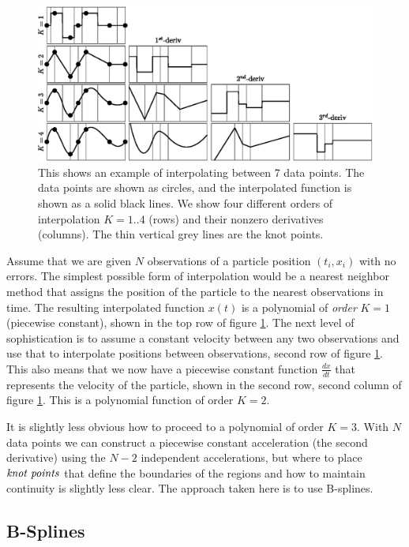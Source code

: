 \documentclass[10pt,journal]{IEEEtran}
\begin{document}
\begin{figure}[t]
  \centerline{\includegraphics[width=39pc,angle=0]{figures/interpolation}}
  
  \caption{This shows an example of interpolating between 7 data points. The data points are shown as circles, and the interpolated function is shown as a solid black lines. We show four different orders of interpolation $K=1..4$ (rows) and their nonzero derivatives (columns). The thin vertical grey lines are the knot points.}
  \label{interpolation}
\end{figure}

Assume that we are given $N$ observations of a particle position $(t_i,x_i)$ with no errors. The simplest possible form of interpolation would be a nearest neighbor method that assigns the position of the particle to the nearest observations in time. The resulting interpolated function $x(t)$ is a polynomial of \emph{order} $K=1$ (piecewise constant), shown in the top row of figure \ref{interpolation}. The next level of sophistication is to assume a constant velocity between any two observations and use that to interpolate positions between observations, second row of figure \ref{interpolation}. This also means that we now have a piecewise constant function $\frac{dx}{dt}$ that represents the velocity of the particle, shown in the second row, second column of figure  \ref{interpolation}. This is a polynomial function of order $K=2$.

It is slightly less obvious how to proceed to a polynomial of order $K=3$. With $N$ data points we can construct a piecewise constant acceleration (the second derivative) using the $N-2$ independent accelerations, but where to place $\emph{knot points}$ that define the boundaries of the regions and how to maintain continuity is slightly less clear. The approach taken here is to use B-splines.

\subsection{B-Splines}
\end{document}
